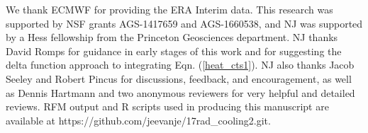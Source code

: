 \documentclass{ametsoc}
\newcommand{\beqn}{\begin{equation}}
\newcommand{\eeqn}{\end{equation}}
\newcommand{\n}{\nonumber}
\newcommand{\eqnref}[1]{(\ref{#1})}
\newcommand{\kg}{\ensuremath{\mathrm{kg}}}
\newcommand{\meter}{\ensuremath{\mathrm{m}}}
\newcommand{\Kelvin}{\ensuremath{\mathrm{K}}}
\newcommand{\cminverse}{\ensuremath{\mathrm{cm^{-1}}}}
\newcommand{\Rv}{\ensuremath{R_v}}
\newcommand{\Ts}{\ensuremath{T_\mathrm{s}}}
\newcommand{\RH}{\ensuremath{\mathrm{RH}}}
\newcommand{\pref}{\ensuremath{p_{\mathrm{ref}}}}
\newcommand{\WVP}{\ensuremath{\mathrm{WVP}}}
\newcommand{\Tav}{\ensuremath{T_{\mathrm{av}}}}
\newcommand{\Tinf}{\ensuremath{T_\infty}}
\newcommand{\kappamin}{\ensuremath{\kappa_{\mathrm{min}}}}
\begin{document}




%
\acknowledgments
We thank ECMWF for providing the ERA Interim data. This research was supported by NSF grants AGS-1417659 and AGS-1660538, and NJ was supported by a  Hess fellowship from the Princeton Geosciences department. NJ thanks David Romps for guidance in early stages of this work and for suggesting the delta function approach to integrating Eqn. \eqnref{heat_cts1}. NJ also thanks Jacob Seeley and Robert Pincus for discussions, feedback, and encouragement, as well as Dennis Hartmann and two anonymous reviewers for very helpful and detailed reviews. RFM output and R scripts used in producing this manuscript are available at  https://github.com/jeevanje/17rad\_cooling2.git.
\end{document}
